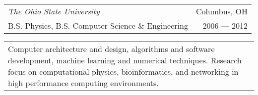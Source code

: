 \begin{tabularx}{\textwidth}{L R}
    \textit{The Ohio State University} & Columbus, OH \\
    \small{B.S. Physics, B.S. Computer Science \& Engineering} & \small{2006 --- 2012} \\
\end{tabularx}
\begin{tabularx}{\textwidth}{X}
\small{Computer architecture and design, algorithms and software development, machine learning and numerical techniques.}
\small{Research focus on computational physics, bioinformatics, and networking in high performance computing environments.}
\end{tabularx}

